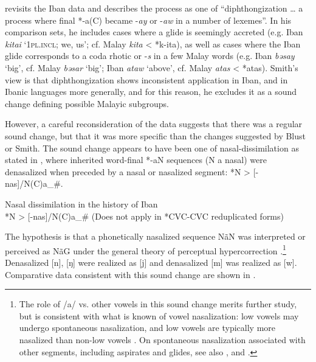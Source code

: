 \documentclass[output=paper]{langscibook}
\begin{document}
\newpage
\citet[193--196]{Smith2017} revisits the Iban data and describes the process as one of “diphthongization … a process where final *-a(C) became -\textit{ay} or -\textit{aw} in a number of lexemes”. In his comparison sets, he includes cases where a glide is seemingly accreted (e.g. Iban \textit{kitai} ‘1\textsc{pl.incl}; we, us’; cf. Malay \textit{kita} < *k-ita), as well as cases where the Iban glide corresponds to a coda rhotic or -\textit{s} in a few Malay words (e.g. Iban \textit{bəsay} ‘big’, cf. Malay \textit{bəsar} ‘big’; Iban \textit{ataw} ‘above’, cf. Malay \textit{atas} < *atas). Smith’s view is that diphthongization shows inconsistent application in Iban, and in Ibanic languages more generally, and for this reason, he excludes it as a sound change defining possible Malayic subgroups.

However, a careful reconsideration of the data suggests that there was a regular sound change, but that it was more specific than the changes suggested by Blust or Smith. The sound change appears to have been one of nasal-dissimilation as stated in , where inherited word-final *-aN sequences (N a nasal) were denasalized when preceded by a nasal or nasalized segment: *N > [-nas]/N(C)a\_\#.

\ea%
\label{ex:blevins:13}Nasal dissimilation in the history of Iban \\
*N > [-nas]/N(C)a\_\# (Does not apply in *CVC-CVC reduplicated forms)
\z

The hypothesis is that a phonetically nasalized sequence NãN was interpreted or perceived as NãG under the general theory of perceptual hypercorrection \citep{Ohala1981}.\footnote{The role of \mbox{/a/} vs. other vowels in this sound change merits further study, but is consistent with what is known of vowel nasalization: low vowels may undergo spontaneous nasalization, and low vowels are typically more nasalized than non-low vowels \citep[9]{Ruhlen1973}. On spontaneous nasalization associated with other segments, including aspirates and glides, see also \citet{Ohala1974, Ohala1975, Matisoff1975, BlevinsGarrett1993}, and \citet{Johnson2019}.} Denasalized [n], [ŋ] were realized as [j] and denasalized [m] was realized as [w]. Comparative data consistent with this sound change are shown in .
\end{document}
